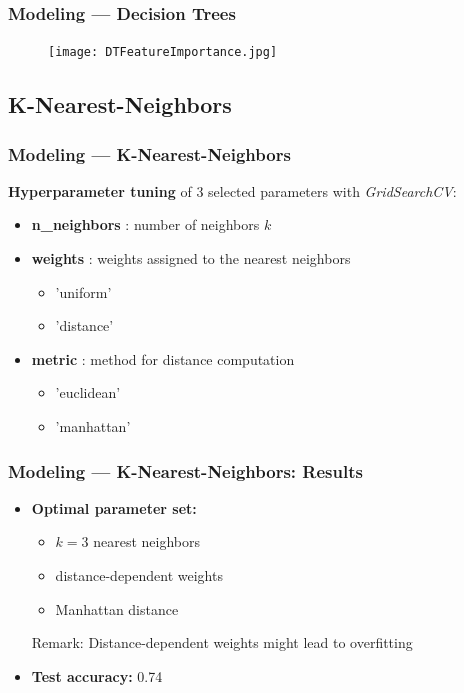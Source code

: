 \documentclass[10pt, aspectratio=169]{beamer}
\begin{document}
\begin{frame}
    \frametitle{Modeling --- Decision Trees}
    \begin{figure}
        \centering
        \texttt{[image: DTFeatureImportance.jpg]}
    \end{figure}
\end{frame}

\subsection{K-Nearest-Neighbors}
\begin{frame}
    \frametitle{Modeling --- K-Nearest-Neighbors}
    \textbf{Hyperparameter tuning} of 3 selected parameters with \textit{GridSearchCV}:
    \begin{itemize}
        \item \textbf{n\_neighbors} : number of neighbors $k$
        \item \textbf{weights} : weights assigned to the nearest neighbors
            \begin{itemize} 
                \item 'uniform'
                \item 'distance'
            \end{itemize}
        \item \textbf{metric} : method for distance computation
            \begin{itemize}
                \item 'euclidean'
                \item 'manhattan'
            \end{itemize}
    \end{itemize}
\end{frame}
\begin{frame}
    \frametitle{Modeling --- K-Nearest-Neighbors: Results}
    \begin{itemize}
        \item \textbf{Optimal parameter set:}
            \begin{itemize}
                \item $k=3$ nearest neighbors
                \item distance-dependent weights
                \item Manhattan distance
            \end{itemize}
            Remark: Distance-dependent weights might lead to overfitting
        \item \textbf{Test accuracy:} 0.74
    \end{itemize}
\end{frame}
\end{document}
